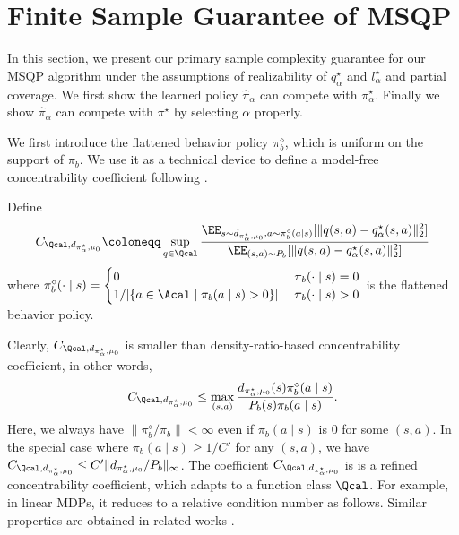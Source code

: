 
\section{Finite Sample Guarantee of MSQP}\label{sec:theory}


In this section, we present our primary sample complexity guarantee for our  MSQP algorithm under the assumptions of realizability of  $q^{\star}_{\alpha}$ and $l^{\star}_{\alpha}$  and partial coverage. We first show the learned policy $\hat \pi_{\alpha}$ can compete with $\pi^{\star}_{\alpha}$.  Finally we show  $\hat \pi_{\alpha}$ can compete with $\pi^{\star}$ by selecting $\alpha$ properly.   

We first introduce the flattened behavior policy $\pi^{\diamond}_b$, which is uniform on the support of $\pi_b$.
We use it as a technical device to define a model-free concentrability coefficient following \citet{xie2021bellman}. 
\begin{definition}
Define
\begin{align*}
    C_{\Qcal,d_{\pi^{\star}_{\alpha},\mu_0} }\coloneqq \sup_{q\in \Qcal}\frac{\EE_{s \sim d_{\pi^{\star}_{\alpha},\mu_0},a\sim \pi^{\diamond}_b(a\mid s) }[\|q(s,a) -q^{\star}_{\alpha}(s,a)\|^2_2 ]}{\EE_{(s,a)\sim P_b}[\|q(s,a) -q^{\star}_{\alpha}(s,a)\|^2_2]}
\end{align*}
where $\pi^{\diamond}_b(\cdot \mid s)=\begin{cases}
     0  \quad & \pi_b(\cdot \mid s) = 0 \\
     1/|\{a \in \Acal\mid \pi_b(a \mid s)>0\}|  \; & \pi_b(\cdot \mid s)>0
    \end{cases}$ is the flattened behavior policy.
\end{definition}
Clearly, $C_{\Qcal,d_{\pi^{\star}_{\alpha},\mu_0} }$ is smaller than density-ratio-based concentrability coefficient, in other words, 
$$C_{\Qcal,d_{\pi^{\star}_{\alpha},\mu_0} }\leq \max_{(s,a)} \frac{d_{\pi^{\star}_{\alpha},\mu_0}(s)\pi^{\diamond}_b(a\mid s)}{P_b(s)\pi_b(a\mid s)}.
$$ 
Here, we always have $\|\pi^{\diamond}_b/\pi_b\|< \infty$ even if $\pi_b(a\mid s)$ is $0$ for some $(s,a)$. In the special case where $\pi_b(a\mid s)\geq 1/C'$ for any $(s,a)$, we have $C_{\Qcal,d_{\pi^{\star}_{\alpha},\mu_0} }\leq C'\|d_{\pi^{\star}_{\alpha},\mu_0}/P_b\|_{\infty} $. 
The coefficient $C_{\Qcal,d_{\pi^{\star}_{\alpha},\mu_0} }$ is is a refined concentrability coefficient, which adapts to a function class $\Qcal$. For example, in linear MDPs, it reduces to a relative condition number as follows. Similar properties are obtained in related works \citep{xie2021bellman,uehara2021pessimistic}. 

